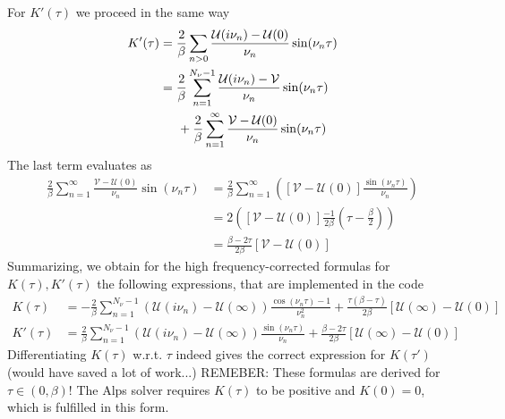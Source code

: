 \documentclass[12pt,a4paper]{scrartcl}
\numberwithin{equation}{section}
\begin{document}
For $K'(\tau)$ we proceed in the same way
\begin{align}
K'(\tau) &= \frac{2}{\beta} \sum_{n>0} \frac{\mathcal{U}(i\nu_n)-\mathcal{U}(0)}{\nu_n}
                                         \sin(\nu_n\tau) \\
%                                        
&= \frac{2}{\beta} \sum_{n=1}^{N_{\nu}-1} \frac{\mathcal{U}(i\nu_n)-\mathcal{V}}{\nu_n}
                                        \sin(\nu_n\tau) \nonumber \\
    &\hspace{0.5cm}+\frac{2}{\beta} \sum_{n=1}^{\infty} \frac{\mathcal{V} -\mathcal{U}(0)}{\nu_n}
                                        \sin(\nu_n\tau) 
\end{align}
The last term evaluates as
\begin{align}
 \frac{2}{\beta} \sum_{n=1}^{\infty} \frac{\mathcal{V} -\mathcal{U}(0)}{\nu_n}
                                        \sin(\nu_n\tau) 
%
& =\frac{2}{\beta} \sum_{n=1}^{\infty}\left( [\mathcal{V} -\mathcal{U}(0)]\frac{\sin(\nu_n\tau)}{\nu_n}
                                          \right) \\
%
& = 2\left( 
            [\mathcal{V} -\mathcal{U}(0)] \frac{-1}{2\beta} \left( \tau -\frac{\beta}{2} \right)             
   \right) \\ 
%
& = \frac{\beta -2\tau}{2\beta}\left[ 
            \mathcal{V} -\mathcal{U}(0)
   \right]
%
\end{align}
Summarizing, we obtain for  the high frequency-corrected formulas for $K(\tau),K'(\tau)$
the following expressions, that are implemented in the code
\begin{align}
K(\tau) 
%
&= -\frac{2}{\beta} \sum_{n=1}^{N_{\nu}-1} \left(\mathcal{U}(i\nu_n)-\mathcal{U}(\infty) \right)
                                        \frac{ \cos(\nu_n\tau)-1 }{\nu_n^2}
 + \frac{\tau(\beta-\tau)}{2\beta}
          \left[ \mathcal{U}(\infty)-\mathcal{U}(0)
           \right]\\
%
%
 K'(\tau) 
%                                        
&= \frac{2}{\beta} \sum_{n=1}^{N_{\nu}-1} \left(\mathcal{U}(i\nu_n)-\mathcal{U}(\infty) \right)
                                        \frac{\sin(\nu_n\tau)}{\nu_n} 
 +\frac{\beta -2\tau}{2\beta}\left[
            \mathcal{U}(\infty) -\mathcal{U}(0)
             \right]
\end{align}
Differentiating $K(\tau)$ w.r.t. $\tau$ indeed gives the correct expression for $K(\tau')$ (would have saved a lot of work...) REMEBER: These formulas are derived for $\tau\in(0,\beta)$!
The Alps solver requires  $K(\tau)$ to be positive and $K(0)=0$, which is fulfilled in this form.
\end{document}
